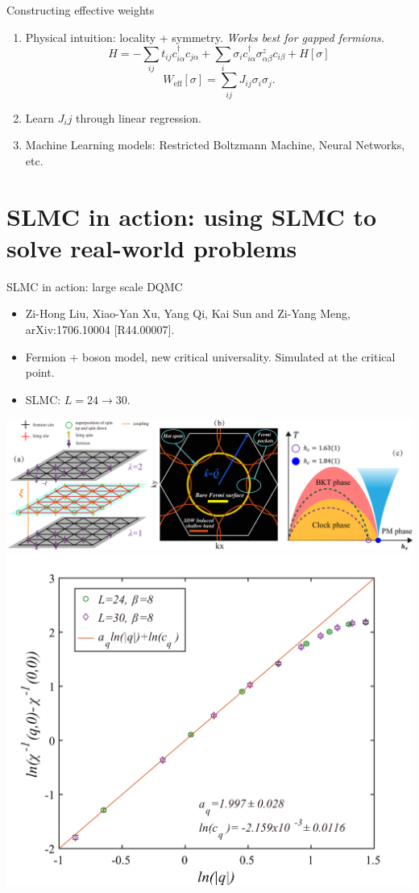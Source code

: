 \documentclass[xcolor=table, 10pt, aspectratio=169]{beamer}
\begin{document}
\begin{frame}{Constructing effective weights}
\begin{enumerate}
  \item Physical intuition: locality + symmetry.
  \emph{Works best for gapped fermions.}
  \[H=-\sum_{ij}t_{ij}c_{i\alpha}^\dagger c_{j\alpha}
  +\sum_i\sigma_ic_{i\alpha}^\dagger\sigma^z_{\alpha\beta} c_{i\beta}
  +H[\sigma]\]
  \[W_{\text{eff}}[\sigma]=\sum_{ij}J_{ij}\sigma_i\sigma_j.\]
	\item Learn $J_ij$ through linear regression.
  \item Machine Learning models: Restricted Boltzmann Machine, Neural Networks, etc.
\end{enumerate}
\end{frame}

\section{SLMC in action: using SLMC to solve real-world problems}

\begin{frame}{SLMC in action: large scale DQMC}
\begin{itemize}
  \item Zi-Hong Liu, Xiao-Yan Xu, Yang Qi, Kai Sun and Zi-Yang Meng, arXiv:1706.10004 [R44.00007].
  \item Fermion + boson model, new critical universality. Simulated at the critical point.
  \item SLMC: $L=24\rightarrow30$.
\end{itemize}
\begin{center}
  \includegraphics[width=.6\textwidth]{combine}
  \includegraphics[width=.4\textwidth]{chi-q-fit}
\end{center}
\end{frame}
\end{document}
